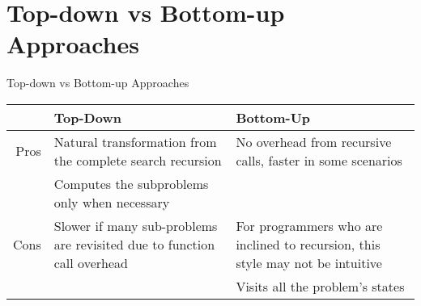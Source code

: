 \section{Top-down vs Bottom-up Approaches}


\begin{frame}{Top-down vs Bottom-up Approaches}
  \begin{tabular}{ r | p{5cm} | p{5cm}}
   & \textbf{Top-Down} & \textbf{Bottom-Up} \\
   \hline
   Pros & Natural transformation from the complete search recursion & No overhead from recursive calls, faster in some scenarios \\
        & Computes the subproblems only when necessary & \\
   \hline
   Cons & Slower if many sub-problems are revisited due to function call overhead & For programmers who are inclined to recursion, this style may not be intuitive \\
        &                                                                         & Visits all the problem's states \\
  \end{tabular}
  \\
  \vspace{2em}
  \cite{halim2013competitive}
\end{frame}


